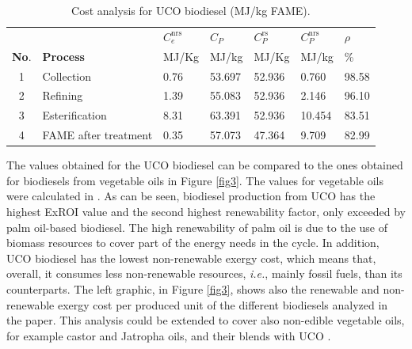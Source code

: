 \documentclass[sustainability,article,accept,moreauthors,pdftex,12pt,a4paper]{mdpi}
\newcommand{\ems}[3][\phantom{\ast}]{\ensuremath{{#2}_{#3}^\mathrm{#1}}}
\begin{document}
\begin{table}[H]
 \centering
 \caption[Cost analysis for UCO biodisel]{Cost analysis for UCO biodiesel (MJ/kg FAME).}
 \begin{tabularx}{0.8\textwidth}{clZZZZZ}
 \toprule
  &       & \boldmath$\ems[nrs]{C}{e}$ & \boldmath$C_P$ & \boldmath$\ems[rs]{C}{P}$ & \boldmath$\ems[nrs]{C}{P}$ & \boldmath$\rho$ \\
 \textbf{No}.  & \textbf{Process} & MJ/Kg & MJ/kg & MJ/Kg & MJ/kg & \% \\
  & Collection   & 0.76 & 53.697 & 52.936 & 0.760 & 98.58 \\
 2 & Refining    & 1.39 & 55.083 & 52.936 & 2.146 & 96.10 \\
 3 & Esterification  & 8.31 & 63.391 & 52.936 & 10.454 & 83.51 \\
 4 & FAME after treatment & 0.35 & 57.073 & 47.364 & 9.709 & 82.99 \\
 \bottomrule
 \end{tabularx}%
 \label{table5}%
\end{table}%

The values obtained for the UCO biodiesel can be compared to the ones obtained for biodiesels from vegetable oils in Figure \ref{fig3}. The values for vegetable oils were calculated in \cite{FontdeMoraThesis2013}. As can be seen, biodiesel production from UCO has the highest ExROI value and the second highest renewability factor, only exceeded by palm oil-based biodiesel. The high renewability of palm oil is due to the use of biomass resources to cover part of the energy needs in the cycle. In addition, UCO biodiesel has the lowest non-renewable exergy cost, which means that, overall, it consumes less non-renewable resources, \textit{i.e.}, mainly fossil fuels, than its counterparts. The left graphic, in Figure \ref{fig3}, shows also the renewable and non-renewable exergy cost per produced unit of the different biodiesels analyzed in the paper. This analysis could be extended to cover also non-edible vegetable oils, for example castor and Jatropha oils, and their blends with UCO \cite{Kannan2013}.
\end{document}
